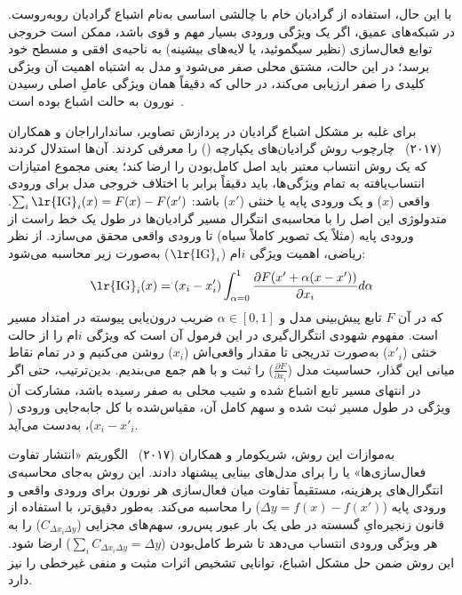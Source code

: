با این حال، استفاده از گرادیان خام با چالشی اساسی به‌نام اشباع گرادیان روبه‌روست. در شبکه‌های عمیق، اگر یک ویژگی ورودی بسیار مهم و قوی باشد، ممکن است خروجی توابع فعال‌سازی (نظیر سیگموئید،  یا لایه‌های بیشینه) به ناحیه‌ی افقی و مسطح خود برسد؛ در این حالت، مشتق محلی صفر می‌شود و مدل به اشتباه اهمیت آن ویژگی کلیدی را صفر ارزیابی می‌کند، در حالی که دقیقاً همان ویژگی عاملِ اصلی رسیدن نورون به حالت اشباع بوده است~\cite{shrikumar17learning}.

برای غلبه بر مشکل اشباع گرادیان در پردازش تصاویر، سانداراراجان و همکاران (۲۰۱۷)~\cite{sundararajan2017axiomatic} چارچوب روش گرادیان‌های یکپارچه () را معرفی کردند. آن‌ها استدلال کردند که یک روش انتساب معتبر باید اصل کامل‌بودن را ارضا کند؛ یعنی مجموع امتیازات انتساب‌یافته به تمام ویژگی‌ها، باید دقیقاً برابر با اختلاف خروجی مدل برای ورودی واقعی ($x$) و یک ورودی پایه یا خنثی ($x'$) باشد: $\sum_i \text{\lr{IG}}_i(x) = F(x) - F(x')$. متدولوژی  این اصل را با محاسبه‌ی انتگرال مسیر گرادیان‌ها در طول یک خط راست از ورودی پایه (مثلاً یک تصویر کاملاً سیاه) تا ورودی واقعی محقق می‌سازد. از نظر ریاضی، اهمیت ویژگی $i$ام ($\text{\lr{IG}}_i$) به‌صورت زیر محاسبه می‌شود:
\begin{equation}\label{eq:chap3_integrated_gradients}
    \text{\lr{IG}}_i(x)=(x_i-x'_i)\int_{\alpha=0}^{1}\frac{\partial F(x'+\alpha(x-x'))}{\partial x_i}d\alpha
\end{equation}
که در آن $F$ تابع پیش‌بینی مدل و $\alpha \in [0, 1]$ ضریب درون‌یابی پیوسته در امتداد مسیر است. مفهوم شهودی انتگرال‌گیری در این فرمول آن است که ویژگی $i$ام را از حالت خنثی ($x'_i$) به‌صورت تدریجی تا مقدار واقعی‌اش ($x_i$) روشن می‌کنیم و در تمام نقاط میانی این گذار، حساسیت مدل ($\frac{\partial F}{\partial x_i}$) را ثبت و با هم جمع می‌بندیم. بدین‌ترتیب، حتی اگر در انتهای مسیر تابع اشباع شده و شیب محلی به صفر رسیده باشد، مشارکت آن ویژگی در طول مسیر ثبت شده و سهم کامل آن، مقیاس‌شده با کل جابه‌جایی ورودی ($x_i - x'_i$)، به‌دست می‌آید.

به‌موازات این روش، شریکومار و همکاران (۲۰۱۷)~\cite{shrikumar17learning} الگوریتم «انتشار تفاوت فعال‌سازی‌ها» یا  را برای مدل‌های بینایی پیشنهاد دادند. این روش به‌جای محاسبه‌ی انتگرال‌های پرهزینه، مستقیماً تفاوت میان فعال‌سازی هر نورون برای ورودی واقعی و ورودی پایه ($\Delta y = f(x) - f(x')$) را محاسبه می‌کند. به‌طور دقیق‌تر، با استفاده از قانون زنجیره‌ایِ گسسته در طی یک بار عبور پس‌رو، سهم‌های مجزایی ($C_{\Delta x_i \Delta y}$) را به هر ویژگی ورودی انتساب می‌دهد تا شرط کامل‌بودن ($\sum_i C_{\Delta x_i \Delta y} = \Delta y$) ارضا شود. این روش ضمن حل مشکل اشباع، توانایی تشخیص اثرات مثبت و منفی غیرخطی را نیز دارد.

